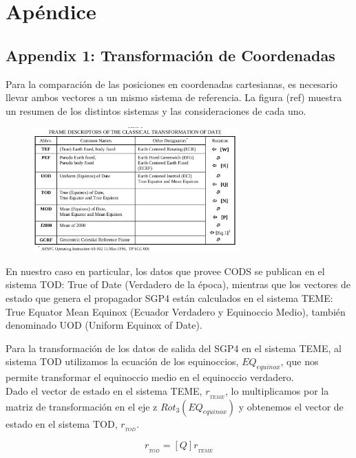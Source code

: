 \chapter{Ap\'endice}
\section{Appendix 1: Transformaci\'on de Coordenadas}
\label{App1}


Para la comparaci\'on de las posiciones en coordenadas cartesianas, es necesario llevar ambos vectores a un mismo sistema de referencia.
La figura (ref) muestra un resumen de los distintos sistemas y las consideraciones de cada uno. 

\begin{figure}[!h]
  \centering
  \includegraphics[width=0.7\textwidth]{imagenes/sistReferencias}
\end{figure}

En nuestro caso en particular, los datos que provee CODS se publican en el sistema TOD: True of Date (Verdadero de la \'epoca), mientras que los vectores de estado que genera el propagador SGP4 est\'an calculados en el sistema TEME: True Equator Mean Equinox (Ecuador Verdadero y Equinoccio Medio), tambi\'en denominado UOD (Uniform Equinox of Date).

Para la transformaci\'on de los datos de salida del SGP4 en el sistema TEME, al sistema TOD utilizamos la ecuaci\'on de los equinoccios, $EQ_{equinox}$, que nos permite transformar el equinoccio medio en el equinoccio verdadero.\\
Dado el vector de estado en el sistema TEME, $r_{_{TEME}}$, lo multiplicamos por la matriz de transformaci\'on en el eje z $Rot_{3}(EQ_{equinox})$ y obtenemos el vector de estado en el sistema TOD, $r_{_{TOD}}$.

\begin{equation}
 r_{_{TOD}} = [Q] r_{_{TEME}}
\end{equation}


